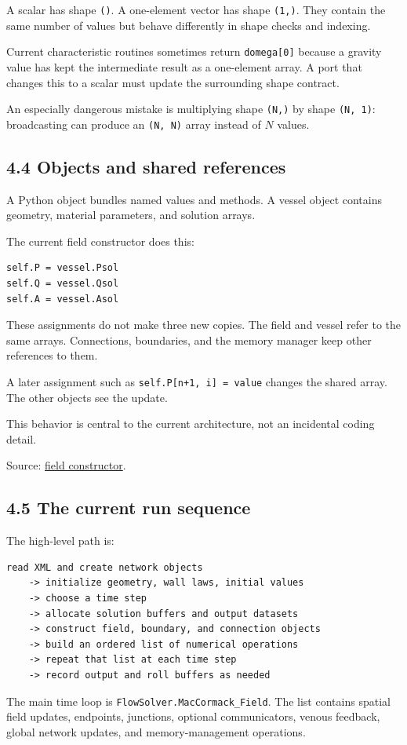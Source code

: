 \documentclass[11pt,a4paper]{article}
\begin{document}
A scalar has shape \texttt{()}. A one-element vector has shape \texttt{(1,)}. They contain the same number of values but behave differently in shape checks and indexing.

Current characteristic routines sometimes return \texttt{domega[0]} because a gravity value has kept the intermediate result as a one-element array. A port that changes this to a scalar must update the surrounding shape contract.

An especially dangerous mistake is multiplying shape \texttt{(N,)} by shape \texttt{(N, 1)}: broadcasting can produce an \texttt{(N, N)} array instead of \(N\) values.

\subsection{4.4 Objects and shared references}
A Python object bundles named values and methods. A vessel object contains geometry, material parameters, and solution arrays.

The current field constructor does this:


\begin{lstlisting}
self.P = vessel.Psol
self.Q = vessel.Qsol
self.A = vessel.Asol
\end{lstlisting}
These assignments do not make three new copies. The field and vessel refer to the same arrays. Connections, boundaries, and the memory manager keep other references to them.

A later assignment such as \texttt{self.\allowbreak{}P[n+1, i] = value} changes the shared array. The other objects see the update.

This behavior is central to the current architecture, not an incidental coding detail.

Source: \href{/home/sadid/starfish/SolverLib/classFields.py}{field constructor}.

\subsection{4.5 The current run sequence}
The high-level path is:


\begin{lstlisting}
read XML and create network objects
    -> initialize geometry, wall laws, initial values
    -> choose a time step
    -> allocate solution buffers and output datasets
    -> construct field, boundary, and connection objects
    -> build an ordered list of numerical operations
    -> repeat that list at each time step
    -> record output and roll buffers as needed
\end{lstlisting}
The main time loop is \texttt{FlowSolver.\allowbreak{}MacCormack\_\allowbreak{}Field}. The list contains spatial field updates, endpoints, junctions, optional communicators, venous feedback, global network updates, and memory-management operations.
\end{document}
